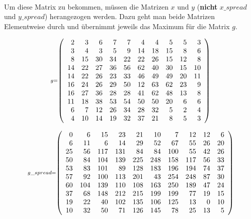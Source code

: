 \documentclass[11pt]{article}
\begin{document}
    \paragraph{}
    Um diese Matrix zu bekommen, müssen die Matrizen $x$ und $y$ (\textbf{nicht} $x\_spread$ und $y\_spread$) herangezogen werden. Dazu geht man beide Matrizen Elementweise durch und übernimmt jeweils das Maximum für die Matrix $g$.


    \[\scriptstyle g =  \def\g{\color{lightgray}}\left(\begin{array}{rrrrrrrrrr}2 & 3 & 6 & 7 & 7 & 4 & 4 & 5 & 5 & 3\\3 & 4 & 3 & 5 & 9 & 14 & 18 & 15 & 8 & 6\\8 & 15 & 30 & 34 & 22 & 22 & 26 & 15 & 12 & 8\\14 & 22 & 27 & 36 & 56 & 62 & 40 & 30 & 15 & 10\\14 & 22 & 26 & 23 & 33 & 46 & 49 & 49 & 20 & 11\\16 & 24 & 26 & 29 & 50 & 12 & 63 & 62 & 23 & 9\\16 & 27 & 36 & 28 & 28 & 41 & 62 & 48 & 13 & 8\\11 & 18 & 38 & 53 & 54 & 50 & 50 & 20 & 6 & 6\\6 & 7 & 12 & 26 & 34 & 28 & 32 & 5 & 2 & 4\\4 & 10 & 14 & 19 & 32 & 37 & 21 & 8 & 5 & 3\end{array}\right)\]

    
    \[\scriptstyle g\_spread =  \def\g{\color{lightgray}}\left(\begin{array}{rrrrrrrrrr}0 & 6 & 15 & 23 & 21 & 10 & 7 & 12 & 12 & 6\\6 & 11 & 6 & 14 & 29 & 52 & 67 & 55 & 26 & 20\\25 & 56 & 117 & 131 & 84 & 84 & 100 & 55 & 42 & 26\\50 & 84 & 104 & 139 & 225 & 248 & 158 & 117 & 56 & 33\\53 & 83 & 101 & 89 & 128 & 183 & 196 & 194 & 74 & 37\\57 & 92 & 100 & 113 & 201 & 43 & 254 & 248 & 87 & 30\\60 & 104 & 139 & 110 & 108 & 163 & 250 & 189 & 47 & 24\\37 & 68 & 148 & 212 & 215 & 199 & 199 & 77 & 19 & 15\\19 & 22 & 40 & 102 & 135 & 106 & 125 & 13 & 0 & 10\\10 & 32 & 50 & 71 & 126 & 145 & 78 & 25 & 13 & 5\end{array}\right)\]
\end{document}
